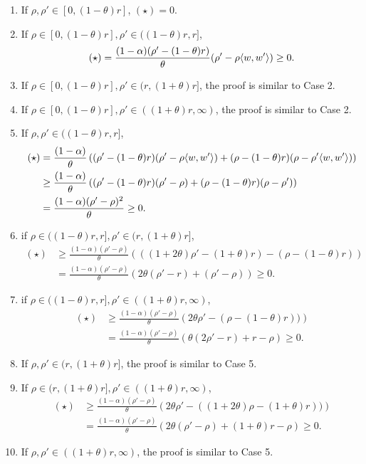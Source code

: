 \begin{enumerate}
	\item If $\rho, \rho' \in [0,(1-\theta)r]$, $(\star) = 0$.
	\item If $\rho \in [0,(1-\theta)r], \rho' \in ((1-\theta)r, r]$, 
	\begin{equation*}
		(\star) = \frac{(1-\alpha)(\rho'-(1-\theta)r)}{\theta}(\rho' - \rho \langle w,w'\rangle) \geq 0.
	\end{equation*}
	\item If $\rho \in [0,(1-\theta)r], \rho' \in (r, (1+\theta)r]$, the proof is similar to Case 2.
	\item If $\rho \in [0,(1-\theta)r], \rho' \in ((1+\theta)r, \infty)$, the proof is similar to Case 2.
	\item If $\rho, \rho' \in ((1-\theta)r,r]$,
	\begin{align*}
		(\star) &= \frac{(1-\alpha)}{\theta} 
		\left (    (\rho'-(1-\theta)r)(\rho' - \rho \langle w,w'\rangle) 
		+ (\rho-(1-\theta)r)(\rho - \rho' \langle w,w'\rangle) \right )\\
		&\geq \frac{(1-\alpha)}{\theta} 
		\left (    (\rho'-(1-\theta)r)(\rho' - \rho) 
		+ (\rho-(1-\theta)r)(\rho - \rho') \right )\\
		&= \frac{(1-\alpha)(\rho'-\rho)^2}{\theta} \geq 0.
	\end{align*}
	\item if $\rho \in ((1-\theta)r,r], \rho' \in (r,(1+\theta)r]$,
	\begin{align*}
		(\star) &\geq \frac{(1-\alpha)(\rho'-\rho)}{\theta} 
		\left (    ((1+2\theta)\rho' - (1+\theta) r) 
		- (\rho - (1-\theta)r ) \right )\\
		&= \frac{(1-\alpha)(\rho'-\rho)}{\theta}
		\left (    2\theta(\rho'-r)+(\rho'-\rho) \right ) \geq 0.
	\end{align*}
	\item if $\rho \in ((1-\theta)r,r], \rho' \in ((1+\theta)r,\infty)$,
	\begin{align*}
		(\star) &\geq \frac{(1-\alpha)(\rho'-\rho)}{\theta} 
		\left (    2\theta\rho' - (\rho - (1-\theta)r) ) \right )\\
		&= \frac{(1-\alpha)(\rho'-\rho)}{\theta}
		\left (    \theta(2\rho'-r)+r-\rho \right ) \geq 0.
	\end{align*}
	\item If $\rho, \rho' \in (r,(1+\theta)r]$, the proof is similar to Case 5.
	\item If $\rho \in (r,(1+\theta)r], \rho' \in ((1+\theta)r,\infty)$,
	\begin{align*}
		(\star) &\geq \frac{(1-\alpha)(\rho'-\rho)}{\theta} 
		\left (    2\theta\rho' - ((1+2\theta)\rho - (1+\theta)r) ) \right )\\
		&= \frac{(1-\alpha)(\rho'-\rho)}{\theta}
		\left (    2\theta(\rho'-\rho) + (1+\theta)r - \rho \right ) \geq 0.
	\end{align*}
	\item If $\rho, \rho' \in ((1+\theta)r,\infty)$, the proof is similar to Case 5.
\end{enumerate}

